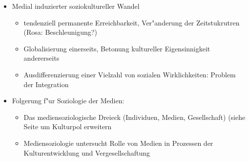 \begin{itemize}
	\item
		Medial induzierter soziokultureller Wandel
		\begin{itemize}
			\item
				tendenziell permanente Erreichbarkeit, Ver"anderung der Zeitstukrutren (Rosa: Beschleunigung?)
			\item
				Globalisierung einerseits, Betonung kultureller Eigensinnigkeit andererseits
			\item
				Ausdifferenzierung einer Vielzahl von sozialen Wirklichkeiten: Problem der Integration
		\end{itemize}
	\item
		Folgerung f"ur Soziologie der Medien:
		\begin{itemize}
			\item
				Das mediensoziologische Dreieck (Individuen, Medien, Gesellschaft) (siehe Seite \pageref{Ziemann} um Kulturpol erweitern
			\item
				Mediensoziologie untersucht Rolle von Medien in Prozessen der Kulturentwicklung und Vergesellschaftung
		\end{itemize}
\end{itemize}

